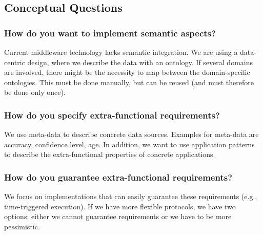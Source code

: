 \subsection{Conceptual Questions}

\subsubsection{How do you want to implement semantic aspects?}

Current middleware technology lacks semantic integration.
We are using a data-centric design, where we describe the data with an ontology.
If several domains are involved, there might be the necessity to map between the domain-specific ontologies.
This must be done manually, but can be reused (and must therefore be done only once).


\subsubsection{How do you specify extra-functional requirements?}

We use meta-data to describe concrete data sources.
Examples for meta-data are accuracy, confidence level, age.
In addition, we want to use application patterns to describe the extra-functional properties of concrete applications.

\subsubsection{How do you guarantee extra-functional requirements?}

We focus on implementations that can easily guarantee these requirements (e.g., time-triggered execution).
If we have more flexible protocols, we have two options: either we cannot guarantee requirements or we have to be more pessimistic.

